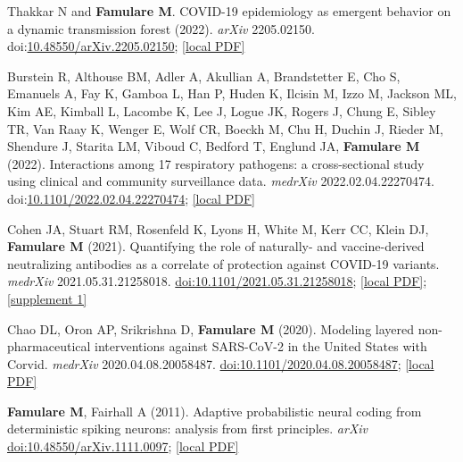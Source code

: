 \documentclass{article}
\begin{document}
\begin{llist}
\begin{items}
\item[{[5]}] Thakkar N and \textbf{Famulare M}. COVID-19 epidemiology as emergent behavior on a dynamic transmission forest (2022). \emph{arXiv} 2205.02150. doi:\href{https://doi.org/10.48550/arXiv.2205.02150}{10.48550/arXiv.2205.02150}; \href{https://famulare.github.io/assets/publication-mirror/preprint-05.pdf}{[local PDF]}

\item[{[4]}] Burstein R, Althouse BM, Adler A, Akullian A, Brandstetter E, Cho S, Emanuels A, Fay K, Gamboa L, Han P, Huden K, Ilcisin M, Izzo M, Jackson ML, Kim AE, Kimball L, Lacombe K, Lee J, Logue JK, Rogers J, Chung E, Sibley TR, Van Raay K, Wenger E, Wolf CR, Boeckh M, Chu H, Duchin J, Rieder M, Shendure J, Starita LM, Viboud C, Bedford T, Englund JA, \textbf{Famulare M} (2022). Interactions among 17 respiratory pathogens: a cross-sectional study using clinical and community surveillance data. \emph{medrXiv} 2022.02.04.22270474. doi:\href{https://doi.org/10.1101/2022.02.04.22270474}{10.1101/2022.02.04.22270474}; \href{https://famulare.github.io/assets/publication-mirror/preprint-04.pdf}{[local PDF]}
	
\item[{[3]}] Cohen JA, Stuart RM, Rosenfeld K, Lyons H, White M, Kerr CC, Klein DJ, \textbf{Famulare M} (2021). Quantifying the role of naturally- and vaccine-derived neutralizing antibodies as a correlate of protection against COVID-19 variants. \emph{medrXiv} 2021.05.31.21258018. \href{https://doi.org/10.1101/2021.05.31.21258018}{doi:10.1101/2021.05.31.21258018}; \href{https://famulare.github.io/assets/publication-mirror/preprint-03.pdf}{[local PDF]}; \href{https://famulare.github.io/assets/publication-mirror/supplements/preprints-3-media-1.pdf}{[supplement 1]}

\item[{[2]}] Chao DL, Oron AP, Srikrishna D, \textbf{Famulare M} (2020). Modeling layered non-pharmaceutical interventions against SARS-CoV-2 in the United States with Corvid. \emph{medrXiv}  2020.04.08.20058487. \href{https://doi.org/10.1101/2020.04.08.20058487}{doi:10.1101/2020.04.08.20058487}; \href{https://famulare.github.io/assets/publication-mirror/preprint-02.pdf}{[local PDF]}

\item[{[1]}] \textbf{Famulare M}, Fairhall A (2011). Adaptive probabilistic neural coding from deterministic spiking neurons: analysis from first principles. \emph{arXiv} \href{https://doi.org/10.48550/arXiv.1111.0097}{doi:10.48550/arXiv.1111.0097}; \href{https://famulare.github.io/assets/publication-mirror/preprint-01.pdf}{[local PDF]}


\end{items}
\end{llist}
\end{document}
